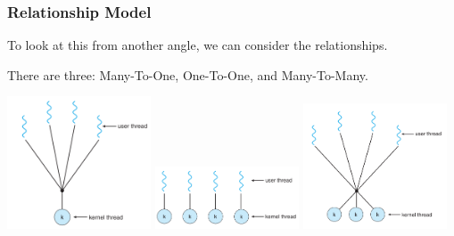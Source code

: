 \begin{frame}
\frametitle{Relationship Model}

To look at this from another angle, we can consider the relationships.

There are three: Many-To-One, One-To-One, and Many-To-Many.

\begin{center}
	\includegraphics[width=0.32\textwidth]{images/threads-manytoone.png}
	\includegraphics[width=0.32\textwidth]{images/threads-onetoone.png}
	\includegraphics[width=0.32\textwidth]{images/threads-manytomany.png}
\end{center}

\end{frame}



